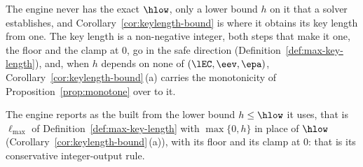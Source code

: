 
The engine never has the exact $\hlow$, only a lower bound $h$ on it that a
solver establishes, and Corollary~\ref{cor:keylength-bound} is where it
obtains its key length from one. The key length is a non-negative integer, both steps that
make it one, the floor and the clamp at $0$, go in the safe direction
(Definition~\ref{def:max-key-length}), and, when $h$ depends on none of
$(\lEC,\eev,\epa)$, Corollary~\ref{cor:keylength-bound}\,(a) carries the
monotonicity of Proposition~\ref{prop:monotone} over to it.

\begin{requirement}\label{req:reported-key-length}
The engine reports as  the 
built from the lower bound $h\le\hlow$ it uses, that is $\ell_{\max}$ of
Definition~\ref{def:max-key-length} with $\max\{0,h\}$ in place of $\hlow$
(Corollary~\ref{cor:keylength-bound}\,(a)), with its floor and its clamp at
$0$: that is its conservative integer-output rule.
\end{requirement}
